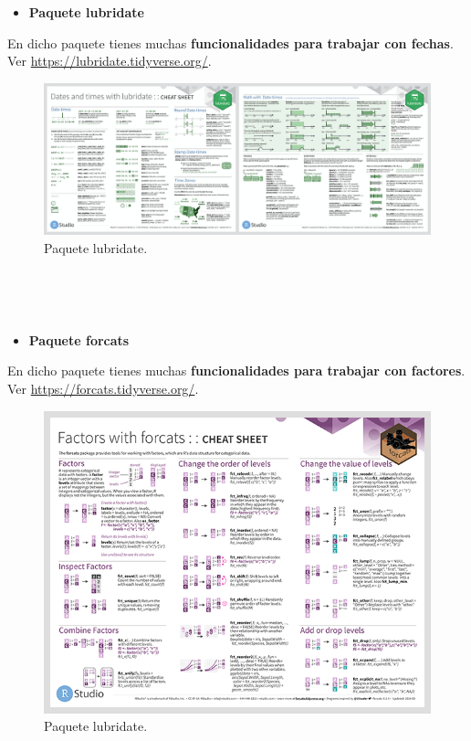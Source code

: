 \documentclass[11pt,]{book}
\providecommand{\tightlist}{%
  \setlength{\itemsep}{0pt}\setlength{\parskip}{0pt}}
\begin{document}
~

~

\begin{itemize}
\tightlist
\item
  \textbf{Paquete lubridate}
\end{itemize}

En dicho paquete tienes muchas \textbf{funcionalidades para trabajar con fechas}. Ver \url{https://lubridate.tidyverse.org/}.

\begin{figure}

{\centering \includegraphics[width=0.95\linewidth]{./img/lubridate} 

}

\caption{Paquete lubridate.}\label{fig:lubridate}
\end{figure}

~

~

\begin{itemize}
\tightlist
\item
  \textbf{Paquete forcats}
\end{itemize}

En dicho paquete tienes muchas \textbf{funcionalidades para trabajar con factores}. Ver \url{https://forcats.tidyverse.org/}.

\begin{figure}

{\centering \includegraphics[width=0.95\linewidth]{./img/forcats} 

}

\caption{Paquete lubridate.}\label{fig:forcats}
\end{figure}
\end{document}
